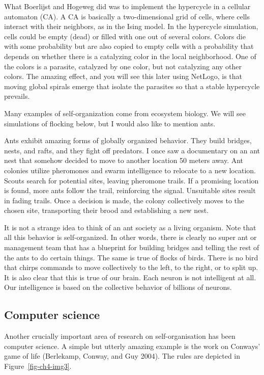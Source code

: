 \documentclass[
  letterpaper,
]{scrbook}
\begin{document}
What Boerlijst and Hogeweg did was to implement the hypercycle in a
cellular automaton (CA). A CA is basically a two-dimensional grid of
cells, where cells interact with their neighbors, as in the Ising model.
In the hypercycle simulation, cells could be empty (dead) or filled with
one out of several colors. Colors die with some probability but are also
copied to empty cells with a probability that depends on whether there
is a catalyzing color in the local neighborhood. One of the colors is a
parasite, catalyzed by one color, but not catalyzing any other colors.
The amazing effect, and you will see this later using NetLogo, is that
moving global spirals emerge that isolate the parasites so that a stable
hypercycle prevails.

Many examples of self-organization come from ecosystem biology. We will
see simulations of flocking below, but I would also like to mention
ants.

Ants exhibit amazing forms of globally organized behavior. They build
bridges, nests, and rafts, and they fight off predators. I once saw a
documentary on an ant nest that somehow decided to move to another
location 50 meters away. Ant colonies utilize pheromones and swarm
intelligence to relocate to a new location. Scouts search for potential
sites, leaving pheromone trails. If a promising location is found, more
ants follow the trail, reinforcing the signal. Unsuitable sites result
in fading trails. Once a decision is made, the colony collectively moves
to the chosen site, transporting their brood and establishing a new
nest.

It is not a strange idea to think of an ant society as a living
organism. Note that all this behavior is self-organized. In other words,
there is clearly no super ant or management team that has a blueprint
for building bridges and telling the rest of the ants to do certain
things. The same is true of flocks of birds. There is no bird that
chirps commands to move collectively to the left, to the right, or to
split up. It is also clear that this is true of our brain. Each neuron
is not intelligent at all. Our intelligence is based on the collective
behavior of billions of neurons.

\hypertarget{computer-science}{%
\subsection{Computer science}\label{computer-science}}

Another crucially important area of research on self-organisation has
been computer science. A simple but utterly amazing example is the work
on Conways' game of life (Berlekamp, Conway, and Guy 2004). The rules
are depicted in Figure~\ref{fig-ch4-img3}.
\end{document}
